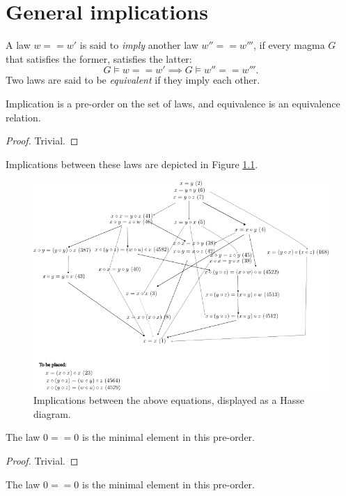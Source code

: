 \chapter{General implications}

\begin{definition}[Implication]\label{impl}  A law $w == w'$ is said to \emph{imply} another law $w'' == w'''$, if every magma $G$ that satisfies the former, satisfies the latter:
  $$ G \models w == w' \implies G \models w'' == w'''.$$
Two laws are said to be \emph{equivalent} if they imply each other.
\end{definition}

\begin{lemma}\label{pre-order}  Implication is a pre-order on the set of laws, and equivalence is an equivalence relation.
\end{lemma}

\begin{proof} Trivial.
\end{proof}

Implications between these laws are depicted in Figure \ref{fig:implications}.

\begin{figure}
  \centering
  \includegraphics[width=0.5\linewidth]{../../images/implications.png}
  \caption{Implications between the above equations, displayed as a Hasse diagram.}
  \label{fig:implications}
\end{figure}


\begin{lemma}\label{minimal}  The law $0 == 0$ is the minimal element in this pre-order.
\end{lemma}

\begin{proof} Trivial.
\end{proof}

\begin{lemma}\label{maximal}  The law $0 == 0$ is the minimal element in this pre-order.
\end{lemma}

